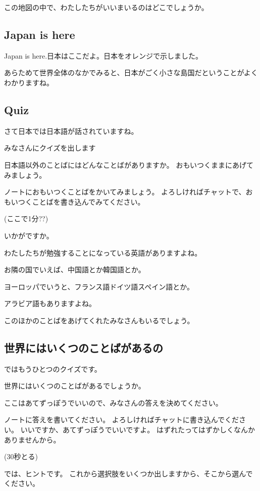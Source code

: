 \documentclass[12pt]{jlreq}
\begin{document}
この地図の中で、わたしたちがいいまいるのはどこでしょうか。

\subsection{Japan is here}

Japan is here.日本はここだよ。日本をオレンジで示しました。

あらためて世界全体のなかでみると、日本がごく小さな島国だということがよくわかりますね。

\subsection{Quiz}

さて日本では日本語が話されていますね。

みなさんにクイズを出します

日本語以外のことばにはどんなことばがありますか。
おもいつくままにあげてみましょう。

ノートにおもいつくことばをかいてみましょう。
よろしければチャットで、おもいつくことばを書き込んでみてください。

(ここで1分??)

いかがですか。

わたしたちが勉強することになっている英語がありますよね。

お隣の国でいえば、中国語とか韓国語とか。

ヨーロッパでいうと、フランス語ドイツ語スペイン語とか。


アラビア語もありますよね。

このほかのことばをあげてくれたみなさんもいるでしょう。

\subsection{世界にはいくつのことばがあるの}

ではもうひとつのクイズです。

世界にはいくつのことばがあるでしょうか。

ここはあてずっぽうでいいので、みなさんの答えを決めてください。

ノートに答えを書いてください。
よろしければチャットに書き込んでください。
いいですか、あてずっぽうでいいですよ。
はずれたってはずかしくなんかありませんから。

(30秒とる)

では、ヒントです。
これから選択肢をいくつか出しますから、そこから選んでください。
\end{document}

